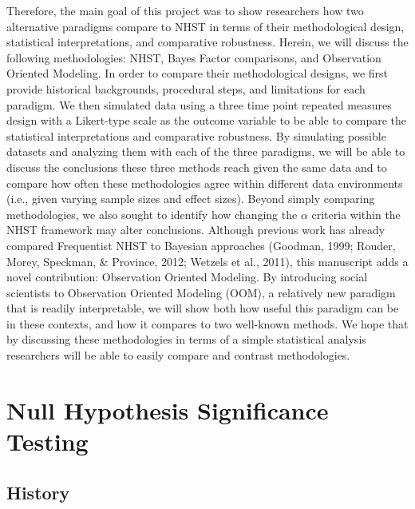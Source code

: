\documentclass[,man, mask]{apa6}
\theoremstyle{definition}
\theoremstyle{definition}
\theoremstyle{definition}
\theoremstyle{remark}
\begin{document}
Therefore, the main goal of this project was to show researchers how two
alternative paradigms compare to NHST in terms of their methodological
design, statistical interpretations, and comparative robustness. Herein,
we will discuss the following methodologies: NHST, Bayes Factor
comparisons, and Observation Oriented Modeling. In order to compare
their methodological designs, we first provide historical backgrounds,
procedural steps, and limitations for each paradigm. We then simulated
data using a three time point repeated measures design with a
Likert-type scale as the outcome variable to be able to compare the
statistical interpretations and comparative robustness. By simulating
possible datasets and analyzing them with each of the three paradigms,
we will be able to discuss the conclusions these three methods reach
given the same data and to compare how often these methodologies agree
within different data environments (i.e., given varying sample sizes and
effect sizes). Beyond simply comparing methodologies, we also sought to
identify how changing the \(\alpha\) criteria within the NHST framework
may alter conclusions. Although previous work has already compared
Frequentist NHST to Bayesian approaches (Goodman, 1999; Rouder, Morey,
Speckman, \& Province, 2012; Wetzels et al., 2011), this manuscript adds
a novel contribution: Observation Oriented Modeling. By introducing
social scientists to Observation Oriented Modeling (OOM), a relatively
new paradigm that is readily interpretable, we will show both how useful
this paradigm can be in these contexts, and how it compares to two
well-known methods. We hope that by discussing these methodologies in
terms of a simple statistical analysis researchers will be able to
easily compare and contrast methodologies. \newline
\newline

\section{Null Hypothesis Significance
Testing}\label{null-hypothesis-significance-testing}

\subsection{History}\label{history}
\end{document}
